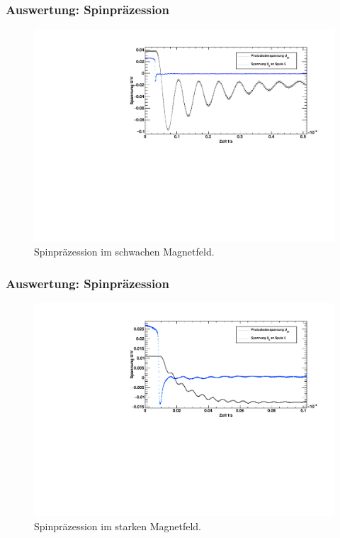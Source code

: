\begin{frame}
\frametitle{Auswertung: Spinpräzession}

\begin{figure}
    \centering
    \includegraphics[width=\textwidth]{../img/02-63-7mA-087mA.pdf}
    \caption{Spinpräzession im schwachen Magnetfeld.}  
\end{figure} 
  
\end{frame}


\begin{frame}
\frametitle{Auswertung: Spinpräzession}

\begin{figure}
    \centering
    \includegraphics[width=\textwidth]{../img/02-63-7mA-020mA.pdf}
    \caption{Spinpräzession im starken Magnetfeld.}  
\end{figure} 
  
\end{frame}



